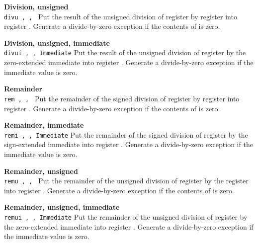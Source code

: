 \noindent
{\bf Division, unsigned}\\
\noindent
\texttt{divu \regd, \regs, \regt}
Put the result of the unsigned division of register \regs{} by register \regt{}
into register \regd{}. Generate a divide-by-zero exception if the contents of \regt{} is zero.
\vspace{3ex}

\noindent
{\bf Division, unsigned, immediate}\\
\noindent
\texttt{divui \regd, \regs, Immediate}
Put the result of the unsigned division of register \regs{} by the zero-extended immediate
into register \regd{}. Generate a divide-by-zero exception if the immediate value is zero. 
\vspace{3ex}

\noindent
{\bf Remainder}\\
\noindent
\texttt{rem \regd, \regs, \regt}
Put the remainder of the signed division of register \regs{} by register \regt{}
into register \regd{}. Generate a divide-by-zero exception if the contents of \regt{} is zero.
\vspace{3ex}
\newpage

\noindent
{\bf Remainder, immediate}\\
\noindent
\texttt{remi \regd, \regs, Immediate}
Put the remainder of the signed division of register \regs{} by the sign-extended immediate
into register \regd{}. Generate a divide-by-zero exception if the immediate value is zero.
\vspace{3ex}

\noindent
{\bf Remainder, unsigned}\\
\noindent
\texttt{remu \regd, \regs, \regt}
Put the remainder of the unsigned division of register \regs{} by the register \regt{}
into register \regd{}. Generate a divide-by-zero exception if the contents of \regt{} is zero.
\vspace{3ex}

\noindent
{\bf Remainder, unsigned, immediate}\\
\noindent
\texttt{remui \regd, \regs, Immediate}
Put the remainder of the unsigned division of register \regs{} by the zero-extended immediate
into register \regd{}. Generate a divide-by-zero exception if the immediate value is zero.
\vspace{3ex}

